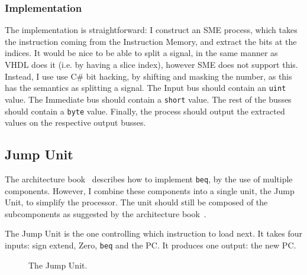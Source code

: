 \subsubsection*{Implementation}
The implementation is straightforward: I construct an SME process, which takes
the instruction coming from the Instruction Memory, and extract the bits at the
indices. It would be nice to be able to split a signal, in the same manner as
VHDL does it (i.e. by having a slice index), however SME does not support this.
Instead, I use use C\# bit hacking, by shifting and masking the number, as this
has the semantics as splitting a signal. The Input bus should contain an
\texttt{uint} value. The Immediate bus should contain a \texttt{short} value.
The rest of the busses should contain a \texttt{byte} value. Finally, the
process should output the extracted values on the respective output busses.

\subsection{Jump Unit}
The architecture book~\cite{ref:ark} describes how to implement \texttt{beq},
by the use of multiple components. However, I combine these components into a
single unit, the Jump Unit, to simplify the processor. The unit should still be
composed of the subcomponents as suggested by the architecture
book~\cite{ref:ark}.

The Jump Unit is the one controlling which instruction to load next. It takes
four inputs: sign extend, Zero, \texttt{beq} and the PC. It produces one
output: the new PC.
\begin{figure}
    \centering
    \caption{The Jump Unit.}
    \label{fig:jump}
\end{figure}

